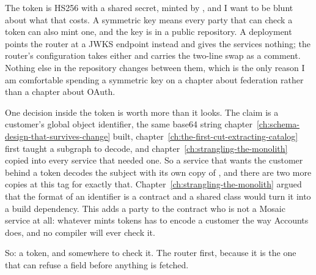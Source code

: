 %
The token is HS256 with a shared secret, minted by
, and I want to be blunt about what that costs.
A symmetric key means every party that can check a token can also mint one, and
the key is in a public repository. A deployment points the router at a JWKS
endpoint instead and gives the services nothing; the router's configuration
takes either and  carries the two-line swap as a
comment. Nothing else in the repository changes between them, which is the only
reason I am comfortable spending a symmetric key on a chapter about federation
rather than a chapter about OAuth.

%
One decision inside the token is worth more than it looks. The  claim
is a customer's global object identifier, the same base64 string
chapter~\ref{ch:schema-design-that-survives-change} built,
chapter~\ref{ch:the-first-cut-extracting-catalog} first taught a subgraph to
decode, and chapter~\ref{ch:strangling-the-monolith} copied into every service
that needed one. So a service that wants the customer behind a token decodes the
subject with its own copy of , and there are two more copies at
this tag for exactly that. Chapter~\ref{ch:strangling-the-monolith} argued that the
format of an identifier is a contract and a shared class would turn it into a
build dependency. This adds a party to the contract who is not a Mosaic service
at all: whatever mints tokens has to encode a customer the way Accounts does,
and no compiler will ever check it.

\medskip
So: a token, and somewhere to check it. The router first, because it is the one
that can refuse a field before anything is fetched.

%
